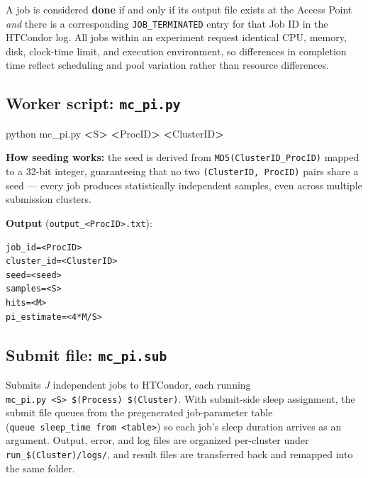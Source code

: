 \documentclass[
]{article}
\newenvironment{Shaded}{\begin{snugshade}}{\end{snugshade}}
\newcommand{\NormalTok}[1]{#1}
\newcommand{\OperatorTok}[1]{\textcolor[rgb]{0.81,0.36,0.00}{\textbf{#1}}}
\begin{document}
A job is considered \textbf{done} if and only if its output file exists
at the Access Point \emph{and} there is a corresponding
\texttt{JOB\_TERMINATED} entry for that Job ID in the HTCondor log. All
jobs within an experiment request identical CPU, memory, disk,
clock-time limit, and execution environment, so differences in
completion time reflect scheduling and pool variation rather than
resource differences.

\subsection{\texorpdfstring{Worker script:
\texttt{mc\_pi.py}}{Worker script: mc\_pi.py}}\label{worker-script-mc_pi.py}

\begin{Shaded}
\begin{Highlighting}[]
\NormalTok{python mc\_pi.py }\OperatorTok{\textless{}}\NormalTok{S}\OperatorTok{\textgreater{}} \OperatorTok{\textless{}}\NormalTok{ProcID}\OperatorTok{\textgreater{}} \OperatorTok{\textless{}}\NormalTok{ClusterID}\OperatorTok{\textgreater{}}
\end{Highlighting}
\end{Shaded}

\textbf{How seeding works:} the seed is derived from
\texttt{MD5(ClusterID\_ProcID)} mapped to a 32-bit integer, guaranteeing
that no two \texttt{(ClusterID,\ ProcID)} pairs share a seed --- every
job produces statistically independent samples, even across multiple
submission clusters.

\textbf{Output} (\texttt{output\_\textless{}ProcID\textgreater{}.txt}):

\begin{verbatim}
job_id=<ProcID>
cluster_id=<ClusterID>
seed=<seed>
samples=<S>
hits=<M>
pi_estimate=<4*M/S>
\end{verbatim}

\subsection{\texorpdfstring{Submit file:
\texttt{mc\_pi.sub}}{Submit file: mc\_pi.sub}}\label{submit-file-mc_pi.sub}

Submits \emph{J} independent jobs to HTCondor, each running
\texttt{mc\_pi.py\ \textless{}S\textgreater{}\ \$(Process)\ \$(Cluster)}.
With submit-side sleep assignment, the submit file queues from the
pregenerated job-parameter table
(\texttt{queue\ sleep\_time\ from\ \textless{}table\textgreater{}}) so
each job's sleep duration arrives as an argument. Output, error, and log
files are organized per-cluster under \texttt{run\_\$(Cluster)/logs/},
and result files are transferred back and remapped into the same folder.
\end{document}
